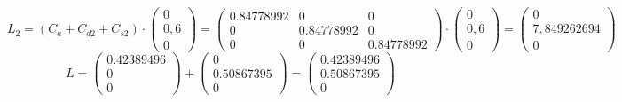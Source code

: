 \documentclass{article}
\begin{document}
\[
L_2=(
C_a+C_{d2}+C_{s2})\cdot
\begin{pmatrix}
0\\0,6\\0
\end{pmatrix}=
\begin{pmatrix}
0.84778992 & 0 & 0\\
0 & 0.84778992 & 0\\
0 & 0 & 0.84778992
\end{pmatrix}\cdot
\begin{pmatrix}
0\\0,6\\0
\end{pmatrix}=
\begin{pmatrix}
0\\7,849262694\\0
\end{pmatrix}
\]
\[
L=
\begin{pmatrix}
0.42389496\\0\\0
\end{pmatrix}+
\begin{pmatrix}
0\\0.50867395\\0
\end{pmatrix}=
\begin{pmatrix}
0.42389496\\0.50867395\\0
\end{pmatrix}
\]
\end{document}
